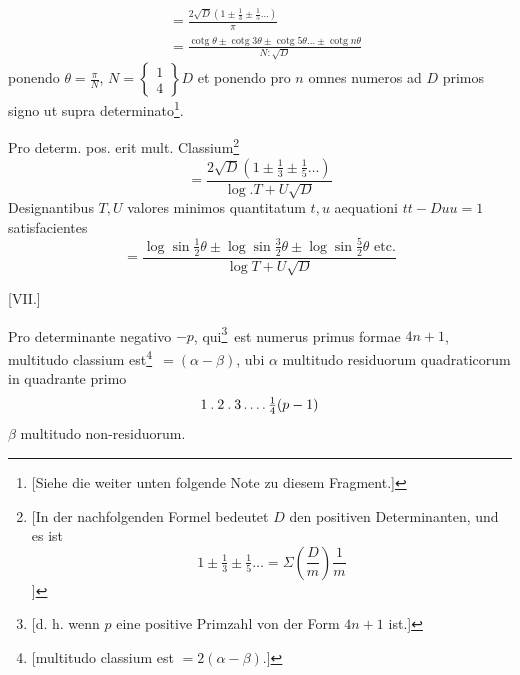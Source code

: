 %
\[
\begin{aligned}
&=\frac{2\surd D(1\pm\tfrac13\pm\tfrac15\ldots)}\pi\\
&=\frac{\operatorname{cotg}\theta\pm\operatorname{cotg}3\theta\pm\operatorname{cotg}5\theta\ldots\pm\operatorname{cotg}n\theta}{N:\surd D}
\end{aligned}
\]
ponendo $\theta=\frac\pi N$, $N=\left\{\begin{smallmatrix}1\\4\end{smallmatrix}\right\}D$ et ponendo pro $n$ omnes numeros ad $D$ primos signo ut supra determinato\begingroup\renewcommand{\thefootnote}{*)}\footnote{[Siehe die weiter unten folgende Note zu diesem Fragment.]}\endgroup.

Pro determ. pos. erit mult. Classium\begingroup\renewcommand{\thefootnote}{**)}\footnote{[In der nachfolgenden Formel bedeutet $D$ den positiven Determinanten, und es ist
\[
1\pm\tfrac13\pm\tfrac15\ldots=\Sigma\left(\frac Dm\right)\frac1m
\]
]}\endgroup
\[
=\frac{2\surd D(1\pm\tfrac13\pm\tfrac15\ldots)}{\log .T+U\surd D}
\]
Designantibus $T,U$ valores minimos quantitatum $t,u$ aequationi $tt-Duu=1$ satisfacientes
\[
=\frac{\log\sin\tfrac12\theta\pm\log\sin\tfrac32\theta\pm\log\sin\tfrac52\theta\text{ etc.}}{\log T+U\surd D}
\]

\par\bigskip{}\centerline{[VII.]}\medskip
Pro determinante negativo $-p$, qui\begingroup\renewcommand{\thefootnote}{***)}\footnote{[d. h. wenn $p$ eine positive Primzahl von der Form $4n+1$ ist.]}\endgroup\ est numerus primus formae $4n+1$, multitudo classium est\begingroup\renewcommand{\thefootnote}{$\dagger$)}\footnote{[multitudo classium est $=2(\alpha-\beta)$.]}\endgroup\ $=(\alpha-\beta)$, ubi $\alpha$ multitudo residuorum quadraticorum in quadrante primo
\[
1\mathbin{.}2\mathbin{.}3\mathinner{.\,.\,.\,.}\tfrac14(p-1)
\]
$\beta$ multitudo non-residuorum.

